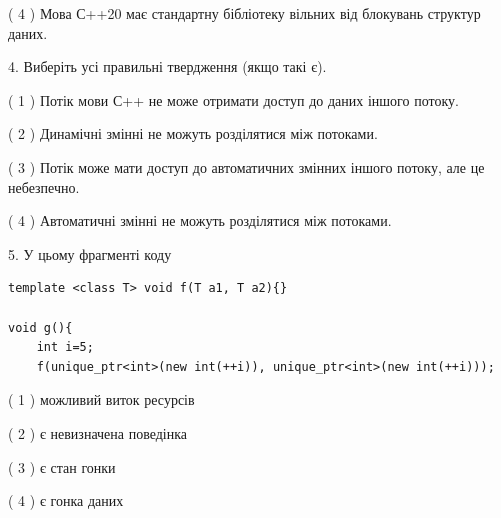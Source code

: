 \documentclass[12pt, ukrainian]{article}
\begin{document}
\begin {large}
{( 4 ) Мова С++20 має стандартну бібліотеку вільних від блокувань структур даних.%


4. Виберіть усі правильні твердження (якщо такі є).\par
\vspace{2mm}

( 1 ) Потік мови С++ не може отримати доступ до даних іншого потоку.%

( 2 ) Динамічні змінні не можуть розділятися між потоками.%

( 3 ) Потік може мати доступ до автоматичних змінних іншого потоку, але це небезпечно.%

( 4 ) Автоматичні змінні не можуть розділятися між потоками.%


5. У цьому фрагменті коду
\begin{verbatim}
template <class T> void f(T a1, T a2){}

void g(){
    int i=5;
    f(unique_ptr<int>(new int(++i)), unique_ptr<int>(new int(++i)));
\end{verbatim}

( 1 ) можливий виток ресурсів%

( 2 ) є невизначена поведінка%

( 3 ) є стан гонки%

( 4 ) є гонка даних%
}
\end {large}
\end{document}
